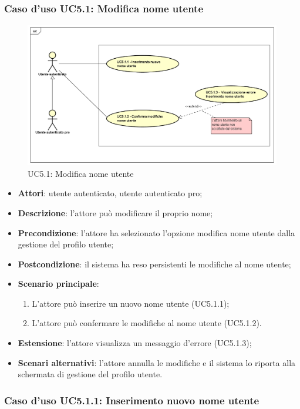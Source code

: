 \subsubsection{Caso d'uso UC5.1: Modifica nome utente}
\label{UC5.1}
\begin{figure}
	\centering
	\includegraphics[scale=0.5]{UML/UC5_1.png}
	\caption{UC5.1: Modifica nome utente}
\end{figure}
\begin{itemize}
	\item \textbf{Attori}: utente autenticato, utente autenticato pro;
	\item \textbf{Descrizione}: l'attore può modificare il proprio nome;
	\item \textbf{Precondizione}: l'attore ha selezionato l'opzione modifica nome utente dalla gestione del profilo utente;
	\item \textbf{Postcondizione}: il sistema ha reso persistenti le modifiche al nome utente;
	\item \textbf{Scenario principale}:
		\begin{enumerate}
			\item L'attore può inserire un nuovo nome utente (UC5.1.1);
			\item L'attore può confermare le modifiche al nome utente (UC5.1.2).
		\end{enumerate}
	\item \textbf{Estensione}: l'attore visualizza un messaggio d'errore (UC5.1.3);
	\item \textbf{Scenari alternativi}: l'attore annulla le modifiche e il sistema lo riporta alla schermata di gestione del profilo utente.
\end{itemize}

\subsubsection{Caso d'uso UC5.1.1: Inserimento nuovo nome utente}

